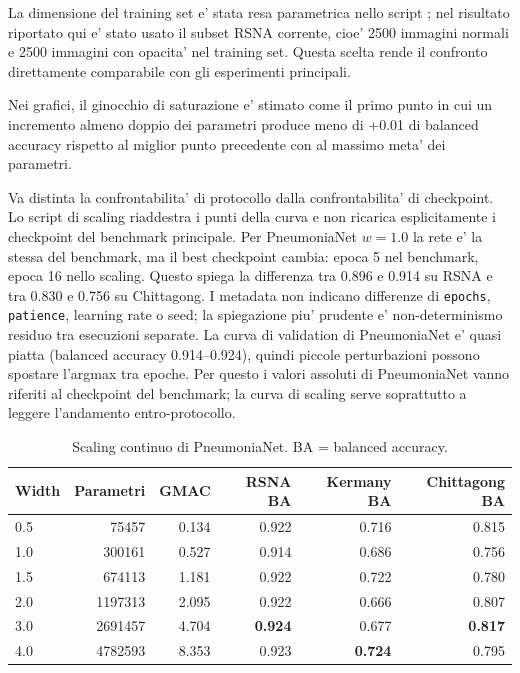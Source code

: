 \documentclass[11pt,a4paper]{article}
\newcommand{\balacc}{balanced accuracy}
\begin{document}
La dimensione del training set e' stata resa parametrica nello script
; nel risultato riportato qui e' stato usato
il subset RSNA corrente, cioe' 2500 immagini normali e 2500 immagini con
opacita' nel training set. Questa scelta rende il confronto direttamente
comparabile con gli esperimenti principali.

Nei grafici, il ginocchio di saturazione e' stimato come il primo punto in cui
un incremento almeno doppio dei parametri produce meno di +0.01 di \balacc{}
rispetto al miglior punto precedente con al massimo meta' dei parametri.

Va distinta la confrontabilita' di protocollo dalla confrontabilita' di
checkpoint. Lo script di scaling riaddestra i punti della curva e non ricarica
esplicitamente i checkpoint del benchmark principale. Per PneumoniaNet \(w=1.0\)
la rete e' la stessa del benchmark, ma il best checkpoint cambia: epoca 5 nel
benchmark, epoca 16 nello scaling. Questo spiega la differenza tra 0.896 e
0.914 su RSNA e tra 0.830 e 0.756 su Chittagong. I metadata non indicano
differenze di \texttt{epochs}, \texttt{patience}, learning rate o seed; la
spiegazione piu' prudente e' non-determinismo residuo tra esecuzioni separate.
La curva di validation di PneumoniaNet e' quasi piatta (\balacc{} 0.914--0.924),
quindi piccole perturbazioni possono spostare l'argmax tra epoche. Per questo i
valori assoluti di PneumoniaNet vanno riferiti al checkpoint del benchmark; la
curva di scaling serve soprattutto a leggere l'andamento entro-protocollo.

\begin{table}[H]
\centering
\caption{Scaling continuo di PneumoniaNet. BA = balanced accuracy.}
\small
\begin{tabular}{lrrrrr}
\toprule
Width & Parametri & GMAC & RSNA BA & Kermany BA & Chittagong BA \\
\midrule
0.5 & 75457 & 0.134 & 0.922 & 0.716 & 0.815 \\
1.0 & 300161 & 0.527 & 0.914 & 0.686 & 0.756 \\
1.5 & 674113 & 1.181 & 0.922 & 0.722 & 0.780 \\
2.0 & 1197313 & 2.095 & 0.922 & 0.666 & 0.807 \\
3.0 & 2691457 & 4.704 & \textbf{0.924} & 0.677 & \textbf{0.817} \\
4.0 & 4782593 & 8.353 & 0.923 & \textbf{0.724} & 0.795 \\
\bottomrule
\end{tabular}
\normalsize
\end{table}
\end{document}
